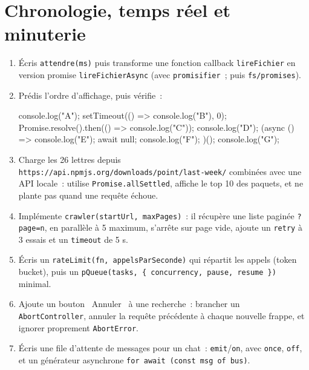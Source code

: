 \section{Chronologie, temps r\'eel et minuterie}


\begin{exercice}
\begin{enumerate}
  \item \'Ecris \verb|attendre(ms)| puis transforme une fonction callback \verb|lireFichier| en
        version promise \verb|lireFichierAsync| (avec \verb|promisifier|~; puis \verb|fs/promises|).
  \item Pr\'edis l'ordre d'affichage, puis v\'erifie~:
\begin{codeplain}
console.log("A");
setTimeout(() => console.log("B"), 0);
Promise.resolve().then(() => console.log("C"));
console.log("D");
(async () => { console.log("E"); await null; console.log("F"); })();
console.log("G");
\end{codeplain}
  \item Charge les 26 lettres depuis \verb|https://api.npmjs.org/downloads/point/last-week/|
        combin\'ees avec une API locale~: utilise \verb|Promise.allSettled|, affiche le top 10 des
        paquets, et ne plante pas quand une requ\^ete \'echoue.
  \item Impl\'emente \verb|crawler(startUrl, maxPages)|~: il r\'ecup\`ere une liste pagin\'ee
        \verb|?page=n|, en parall\`ele \`a 5 maximum, s'arr\^ete sur page vide, ajoute un
        \verb|retry| \`a 3 essais et un \verb|timeout| de 5 s.
  \item \'Ecris un \verb|rateLimit(fn, appelsParSeconde)| qui r\'epartit les appels (token bucket),
        puis un \verb|pQueue(tasks, { concurrency, pause, resume })| minimal.
  \item Ajoute un bouton \og ~Annuler~ \fg{} \`a une recherche~: brancher un \verb|AbortController|,
        annuler la requ\^ete pr\'ec\'edente \`a chaque nouvelle frappe, et ignorer proprement
        \verb|AbortError|.
  \item \'Ecris une file d'attente de messages pour un chat~: \verb|emit|/\verb|on|, avec
        \verb|once|, \verb|off|, et un g\'en\'erateur asynchrone \verb|for await (const msg of bus)|.
\end{enumerate}
\end{exercice}

